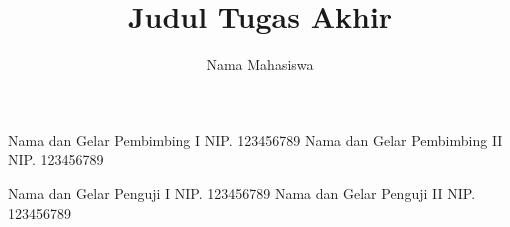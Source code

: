 \documentclass[12pt, a4paper, onecolumn, oneside, final]{report}
\begin{document}

    
    \title{Judul Tugas Akhir} 	
    
    \author{Nama Mahasiswa}		%
	
	\dosbingA%
		{Nama dan Gelar Pembimbing I}%
		{NIP. 123456789}				%
	\dosbingB%
		{Nama dan Gelar Pembimbing II}%
		{NIP. 123456789}				%
		
	\pengujiA%
		{Nama dan Gelar Penguji I}%
		{NIP. 123456789}				%
	\pengujiB%
		{Nama dan Gelar Penguji II}%
		{NIP. 123456789}				%

	\sloppy %
    \setcounter{page}{1} %

    
%    
%    

    \tableofcontents
    \pagebreak
    \listoftables
    \pagebreak
    \listoffigures
    \pagebreak
    \listofmyequations
    \pagebreak
%    
\end{document}
